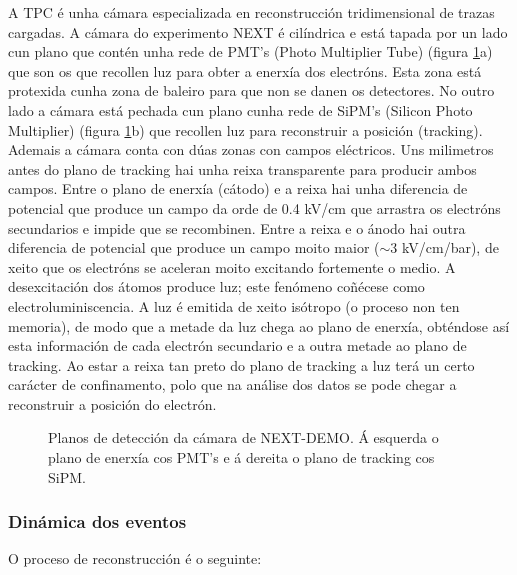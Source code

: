 \documentclass[a4paper,12pt]{article}
\begin{document}
A TPC é unha cámara especializada en reconstrucción tridimensional de trazas cargadas. A cámara do experimento NEXT é cilíndrica e está tapada por un lado cun plano que contén unha rede de PMT's (Photo Multiplier Tube) (figura \ref{pmtsipm}a) que son os que recollen luz para obter a enerxía dos electróns. Esta zona está protexida cunha zona de baleiro para que non se danen os detectores. No outro lado a cámara está pechada cun plano cunha rede de SiPM's (Silicon Photo Multiplier) (figura \ref{pmtsipm}b) que recollen luz para reconstruir a posición (tracking). Ademais a cámara conta con dúas zonas con campos eléctricos. Uns milimetros antes do plano de tracking hai unha reixa transparente para producir ambos campos. Entre o plano de enerxía (cátodo) e a reixa hai unha diferencia de potencial que produce un campo da orde de 0.4 kV/cm que arrastra os electróns secundarios e impide que se recombinen. Entre a reixa e o ánodo hai outra diferencia de potencial que produce un campo moito maior ($\sim$3 kV/cm/bar), de xeito que os electróns se aceleran moito excitando fortemente o medio. A desexcitación dos átomos produce luz; este fenómeno coñécese como electroluminiscencia. A luz é emitida de xeito isótropo (o proceso non ten memoria), de modo que a metade da luz chega ao plano de enerxía, obténdose así esta información de cada electrón secundario e a outra metade ao plano de tracking. Ao estar a reixa tan preto do plano de tracking a luz terá un certo carácter de confinamento, polo que na análise dos datos se pode chegar a reconstruir a posición do electrón.

\begin{figure}[!]
\centering
{}
\caption{Planos de detección da cámara de NEXT-DEMO. Á esquerda o plano de enerxía cos PMT's e á dereita o plano de tracking cos SiPM.}
\label{pmtsipm}
\end{figure}

\subsubsection{Dinámica dos eventos}

O proceso de reconstrucción é o seguinte:
\end{document}
